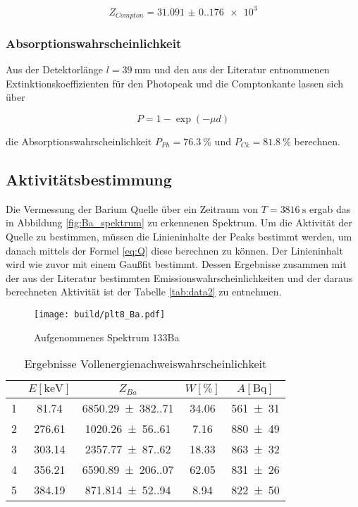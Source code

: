 \begin{equation*}
	Z_{Compton}=\num{31.091(0.176)e3}
\end{equation*}

\subsubsection{Absorptionswahrscheinlichkeit}
Aus der Detektorlänge $l=\qty{39}{\milli\meter}$ und den aus der Literatur
\cite{web:nist} entnommenen Extinktionskoeffizienten für den Photopeak und die
Comptonkante lassen sich über

\begin{equation}
	P=1-\exp(-\mu d)
	\label{eq:Absorption}
\end{equation}

die Absorptionswahrscheinlichkeit $P_{Ph}=\qty{76.3}{\%}$ und
$P_{Ck}=\qty{81.8}{\%}$ berechnen.

\subsection{Aktivitätsbestimmung}
Die Vermessung der Barium Quelle über ein Zeitraum von $T=\qty{3816}{\second}$
ergab das in Abbildung \eqref{fig:Ba_spektrum} zu erkennenen Spektrum. Um die
Aktivität der Quelle zu bestimmen, müssen die Linieninhalte der Peaks bestimmt
werden, um danach mittels der Formel \eqref{eq:Q} diese berechnen zu können. Der
Linieninhalt wird wie zuvor mit einem Gaußfit bestimmt. Dessen Ergebnisse
zusammen mit der aus der Literatur \cite{web:nuclear} bestimmten
Emissionswahrscheinlichkeiten und der daraus berechneten Aktivität ist der
Tabelle \eqref{tab:data2} zu entnehmen.

\begin{figure}[H]
	\centering
	\texttt{[image: build/plt8\_Ba.pdf]}
	\caption{Aufgenommenes Spektrum 133Ba}
	\label{fig:Ba_spektrum}
\end{figure}

\begin{table}[H]
	\centering
	\caption{Ergebnisse Vollenergienachweiswahrscheinlichkeit}
	\begin{tabular}{c c c c c}
		\toprule
		\text{Peak} & $ E [\unit{\kilo\eV}] $ & $ Z_{Ba} $            & $ W [\%] $  & $ A [\unit{\becquerel}] $ \\
		\midrule
		1           & \num{81.74}             & \num{6850.29(382.71)} & \num{34.06} & \num{561(31)}       \\
		2           & \num{276.61}            & \num{1020.26(56.61)}  & \num{7.16}  & \num{880(49)}       \\
		3           & \num{303.14}            & \num{2357.77(87.62)}  & \num{18.33} & \num{863(32)}       \\
		4           & \num{356.21}            & \num{6590.89(206.07)} & \num{62.05} & \num{831(26)}       \\
		5           & \num{384.19}            & \num{871.814(52.94)}  & \num{8.94}  & \num{822(50)}       \\
		\bottomrule
	\end{tabular}
	\label{tab:data2}
\end{table}

